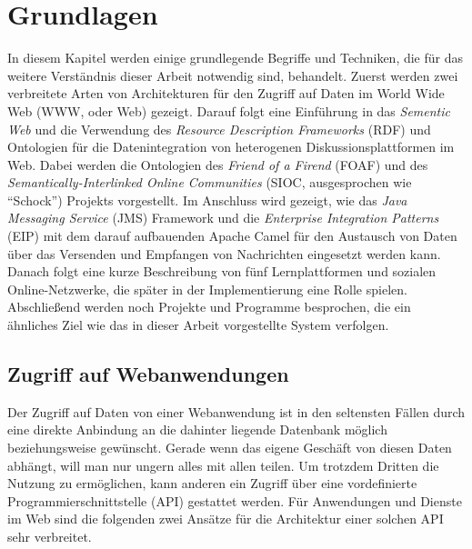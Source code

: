 

\chapter{Grundlagen} %
\label{cha:grundlagen}


In diesem Kapitel werden einige grundlegende Begriffe und Techniken, die für das weitere Verständnis dieser Arbeit notwendig sind, behandelt. Zuerst werden zwei verbreitete Arten von Architekturen für den Zugriff auf Daten im World Wide Web (WWW, oder Web) gezeigt. Darauf folgt eine Einführung in das \emph{Sementic Web} und die Verwendung des \emph{Resource Description Frameworks} (RDF) und Ontologien für die Datenintegration von heterogenen Diskussionsplattformen im Web. Dabei werden die Ontologien des \emph{Friend of a Firend} (FOAF) und des \emph{Semantically-Interlinked Online Communities} (SIOC, ausgesprochen wie \enquote{Schock}) Projekts vorgestellt. Im Anschluss wird gezeigt, wie das \emph{Java Messaging Service} (JMS) Framework und die \emph{Enterprise Integration Patterns} (EIP) mit dem darauf aufbauenden Apache Camel für den Austausch von Daten über das Versenden und Empfangen von Nachrichten eingesetzt werden kann. Danach folgt eine kurze Beschreibung von fünf Lernplattformen und sozialen Online-Netzwerke, die später in der Implementierung eine Rolle spielen. Abschließend werden noch Projekte und Programme besprochen, die ein ähnliches Ziel wie das in dieser Arbeit vorgestellte System verfolgen.

\section{Zugriff auf Webanwendungen} %
\label{sec:zugriff_auf_webanwendungen}

Der Zugriff auf Daten von einer Webanwendung ist in den seltensten Fällen durch eine direkte Anbindung an die dahinter liegende Datenbank möglich beziehungsweise gewünscht. Gerade wenn das eigene Geschäft von diesen Daten abhängt, will man nur ungern alles mit allen teilen. Um trotzdem Dritten die Nutzung zu ermöglichen, kann anderen ein Zugriff über eine vordefinierte Programmierschnittstelle (API) gestattet werden. Für Anwendungen und Dienste im Web sind die folgenden zwei Ansätze für die Architektur einer solchen API sehr verbreitet. 

